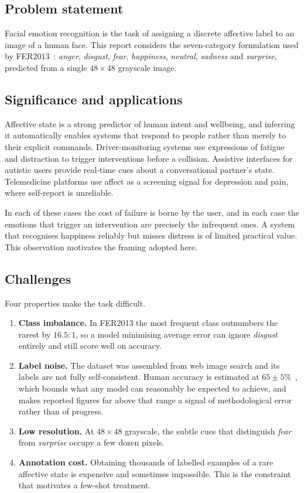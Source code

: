 \documentclass[11pt,a4paper]{article}
\begin{document}
\subsection{Problem statement}
Facial emotion recognition is the task of assigning a discrete affective label
to an image of a human face. This report considers the seven-category
formulation used by FER2013~\cite{goodfellow2013challenges}: \emph{anger},
\emph{disgust}, \emph{fear}, \emph{happiness}, \emph{neutral}, \emph{sadness}
and \emph{surprise}, predicted from a single $48\times48$ grayscale image.

\subsection{Significance and applications}
Affective state is a strong predictor of human intent and wellbeing, and
inferring it automatically enables systems that respond to people rather than
merely to their explicit commands. Driver-monitoring systems use expressions of
fatigue and distraction to trigger interventions before a collision. Assistive
interfaces for autistic users provide real-time cues about a conversational
partner's state. Telemedicine platforms use affect as a screening signal for
depression and pain, where self-report is unreliable.

In each of these cases the cost of failure is borne by the user, and in each
case the emotions that trigger an intervention are precisely the infrequent
ones. A system that recognises happiness reliably but misses distress is of
limited practical value. This observation motivates the framing adopted here.

\subsection{Challenges}
Four properties make the task difficult.

\begin{enumerate}\itemsep3pt
\item \textbf{Class imbalance.} In FER2013 the most frequent class outnumbers
the rarest by $16.5{:}1$, so a model minimising average error can ignore
\emph{disgust} entirely and still score well on accuracy.

\item \textbf{Label noise.} The dataset was assembled from web image search and
its labels are not fully self-consistent. Human accuracy is estimated at
$65 \pm 5\%$~\cite{goodfellow2013challenges}, which bounds what any model can
reasonably be expected to achieve, and makes reported figures far above that
range a signal of methodological error rather than of progress.

\item \textbf{Low resolution.} At $48\times48$ grayscale, the subtle cues that
distinguish \emph{fear} from \emph{surprise} occupy a few dozen pixels.

\item \textbf{Annotation cost.} Obtaining thousands of labelled examples of a
rare affective state is expensive and sometimes impossible. This is the
constraint that motivates a few-shot treatment.
\end{enumerate}
\end{document}
